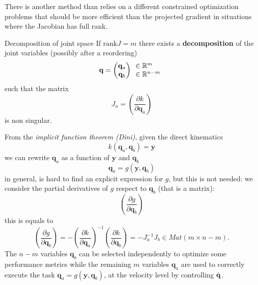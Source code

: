 \documentclass[10pt, a4paper]{report}
\begin{document}
There is another method than relies on a different constrained optimization problems that should be more efficient than the projected gradient in situations where the Jacobian has full rank.
\begin{boxproposition}{Decomposition of joint space}{}
    If $\text{rank} J=m$ there exists a \textbf{decomposition} of the joint variables (possibly after a reordering) \begin{equation}
        \mathbf q=\begin{pmatrix}
            \mathbf q_a \\
            \mathbf q_b
        \end{pmatrix}
        \begin{array}{l}
            \in {\mathbb R}^m \\
            \in {\mathbb R}^{n-m}
        \end{array}
    \end{equation}
    such that the matrix \begin{equation}
        J_a=\left(\frac{\partial  k}{\partial \mathbf q_a}\right)
    \end{equation}
    is non singular.
\end{boxproposition}
\noindent From the \textit{implicit function theorem (Dini)}, given the direct kinematics\begin{equation}
    k(\mathbf q_a,\mathbf q_b)=\mathbf y
\end{equation}
we can rewrite $\mathbf q_a$ as a function of $\mathbf y$ and $\mathbf q_b$\begin{equation}
    \mathbf q_a=g(\mathbf y,\mathbf q_b)
\end{equation}
in general, is hard to find an explicit expression for $g$, but this is not needed: we consider the partial derivatives of $g$ respect to $\mathbf q_b$ (that is a matrix):\begin{equation}
   \left(\frac{\partial  g}{\partial \mathbf q_b}\right)
\end{equation}
this is equals to\begin{equation}
    \left(\frac{\partial  g}{\partial \mathbf q_b}\right)=-\left(\frac{\partial  k}{\partial \mathbf q_a}\right)^{-1}\left(\frac{\partial  k}{\partial \mathbf q_b}\right)=-J_a^{-1}J_b\in Mat(m\times n-m).
\end{equation}
The $n-m$ variables $\mathbf q_b$ can be selected independently to optimize some performance metrics while the remaining $m$ variables $\mathbf q_a$ are used to correctly execute the task $\mathbf q_a=g(\mathbf y,\mathbf q_b)$, at the velocity level by controlling ${\dot{\mathbf q}}$.\bigskip 
\end{document}
